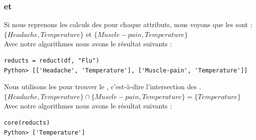 \subsubsection{\reduct et \core}
Si nous reprenons les calculs des \posreg pour chaque
attributs, nous voyons que les \reduct sont : \\
$\{Headache, Temperature\}$ et $\{Muscle-pain, Temperature\}$ \\
Avec notre algorithmes nous avons le résultat suivants :
\begin{lstlisting}
reducts = reduct(df, "Flu")
Python> [['Headache', 'Temperature'], ['Muscle-pain', 'Temperature']]
\end{lstlisting}
Nous utilisons les \reduct pour trouver le \core,
c'est-à-dire l'intersection des \reduct. \\
$\{Headache, Temperature\} \cap \{Muscle-pain, Temperature\}
	= \{Temperature\}$ \\
Avec notre algorithmes nous avons le résultat suivants :
\begin{lstlisting}
core(reducts)
Python> ['Temperature']
\end{lstlisting}
\newpage
